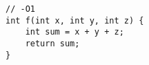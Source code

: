 \begin{lstlisting}[title=\href{https://godbolt.org/z/8ANjkQ}{\texttt{godbolt.org/z/8ANjkQ}}]
// -O1
int f(int x, int y, int z) {
    int sum = x + y + z;
    return sum;
}
\end{lstlisting}
